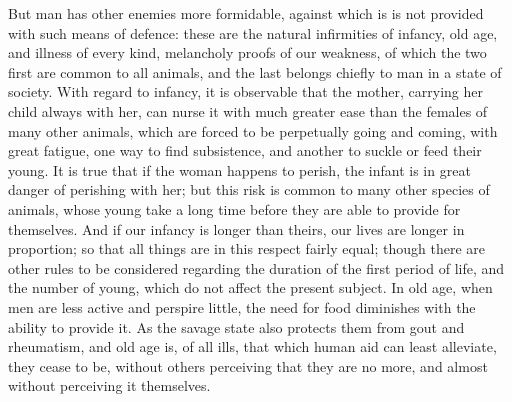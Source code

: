 \documentclass[12pt]{report}
\begin{document}
But man has other enemies more formidable, against which is is not provided with such means of defence: these are the natural infirmities of infancy, old age, and illness of every kind, melancholy proofs of our weakness, of which the two first are common to all animals, and the last belongs chiefly to man in a state of society. With regard to infancy, it is observable that the mother, carrying her child always with her, can nurse it with much greater ease than the females of many other animals, which are forced to be perpetually going and coming, with great fatigue, one way to find subsistence, and another to suckle or feed their young. It is true that if the woman happens to perish, the infant is in great danger of perishing with her; but this risk is common to many other species of animals, whose young take a long time before they are able to provide for themselves. And if our infancy is longer than theirs, our lives are longer in proportion; so that all things are in this respect fairly equal; though there are other rules to be considered regarding the duration of the first period of life, and the number of young, which do not affect the present subject. In old age, when men are less active and perspire little, the need for food diminishes with the ability to provide it. As the savage state also protects them from gout and rheumatism, and old age is, of all ills, that which human aid can least alleviate, they cease to be, without others perceiving that they are no more, and almost without perceiving it themselves.
\end{document}
